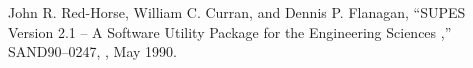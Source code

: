 John R. Red-Horse, William C. Curran, and Dennis P. Flanagan,
``SUPES Version 2.1 -- A Software Utility Package for the Engineering
Sciences ,'' SAND90--0247, \SNLA, May 1990.
